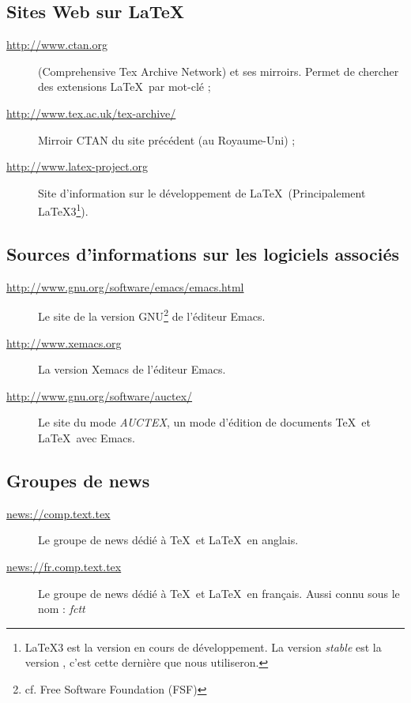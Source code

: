\subsection{Sites Web sur \LaTeX}
\label{sec:websites}

\begin{description}
\item[\url{http://www.ctan.org}] (Comprehensive Tex Archive Network)
  et ses mirroirs.  Permet de chercher des extensions \LaTeX\ par
  mot-clé ;
\item[\url{http://www.tex.ac.uk/tex-archive/}] Mirroir CTAN du site
  précédent (au Royaume-Uni) ;
\item[\url{http://www.latex-project.org}] Site d'information sur le
  développement de \LaTeX\ (Principalement \LaTeX3\footnote{\LaTeX3
    est la version en cours de développement. La version \emph{stable}
    est la version \LaTeXe, c'est cette dernière que nous
    utiliseron.}).
\end{description}


\subsection{Sources d'informations sur les logiciels associés}

\begin{description}
\item[\url{http://www.gnu.org/software/emacs/emacs.html}] Le site de
  la version GNU\footnote{cf. Free Software Foundation (FSF)} de
  l'éditeur Emacs.
\item[\url{http://www.xemacs.org}] La version Xemacs de l'éditeur
  Emacs.
\item[\url{http://www.gnu.org/software/auctex/}] Le site du mode
  \emph{AUCTEX}, un mode d'édition de documents \TeX\ et \LaTeX\ avec
  Emacs.
\end{description}


\subsection{Groupes de news}
\label{sec:newsgroups}

\begin{description}
\item[\url{news://comp.text.tex}] Le groupe de news dédié à \TeX\ et
  \LaTeX\ en anglais.
\item[\url{news://fr.comp.text.tex}] Le groupe de news dédié à \TeX\
  et \LaTeX\ en français. Aussi connu sous le nom : \emph{fctt}
\end{description}



